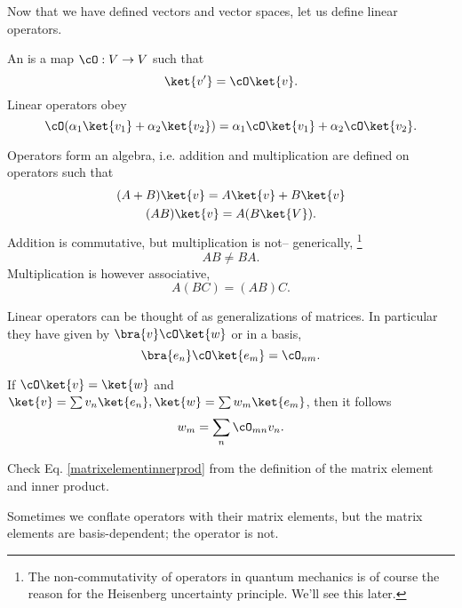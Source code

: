 Now that we have defined vectors and vector spaces, let us define linear operators.
\begin{defn}
An  is a map $\cO: V\to V$ such that
\begin{equation}
    \ket{v'}=\cO \ket{v}.
\end{equation}
Linear operators obey
\begin{equation}
    \cO(\alpha_1\ket{v_1}+\alpha_2 \ket{v_2})=\alpha_1 \cO \ket{v_1} +\alpha_2 \cO \ket{v_2}.
\end{equation}
\end{defn}
%
Operators form an algebra, i.e. addition and multiplication are defined on operators such that
\begin{gather}
    (A+B)\ket{v}=A\ket{v} + B\ket{v}\\
    (AB)\ket{v}= A(B\ket{V}).
\end{gather}
Addition is commutative, but multiplication is not-- generically,%
    \footnote{The non-commutativity of operators in quantum mechanics is of course the reason for the Heisenberg uncertainty principle. We'll see this later.}
\begin{equation}
    AB \neq BA.
\end{equation}
Multiplication is however associative,
\begin{equation}
    A(BC)=(AB)C.
\end{equation}

Linear operators can be thought of as generalizations of matrices. In particular they have  given by $\bra{v} \cO \ket{w}$ or in a basis,
\begin{equation}
    \bra{e_n} \cO \ket{e_m} = \cO_{nm}.
\end{equation}

If $\cO\ket{v}=\ket{w}$ and $\ket{v}=\sum v_n \ket{e_n},\ket{w} = \sum w_m \ket{e_m}$, then it follows 
\begin{equation}\label{matrixelementinnerprod}
    w_m = \sum_n \cO_{mn} v_n.
\end{equation}
\begin{ex}
    Check Eq. \ref{matrixelementinnerprod} from the definition of the matrix element and inner product.
\end{ex}
Sometimes we conflate operators with their matrix elements, but the matrix elements are basis-dependent; the operator is not.

